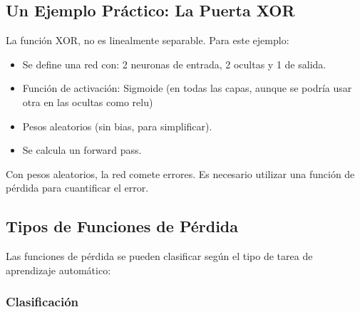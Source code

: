 \documentclass{article}
\begin{document}
\subsection{Un Ejemplo Práctico: La Puerta XOR}
La función XOR, no es linealmente separable. Para este ejemplo:

\begin{itemize}
    \item Se define una red con: 2 neuronas de entrada, 2 ocultas y 1 de salida.
    \item Función de activación: Sigmoide (en todas las capas, aunque se podría usar otra en las ocultas como relu)
    \item Pesos aleatorios (sin bias, para simplificar).
    \item Se calcula un forward pass.
\end{itemize}

Con pesos aleatorios, la red comete errores. Es necesario utilizar una función de pérdida para cuantificar el error.

\subsection{Tipos de Funciones de Pérdida}

Las funciones de pérdida se pueden clasificar según el tipo de tarea de aprendizaje automático:

\subsubsection{Clasificación}
\end{document}
